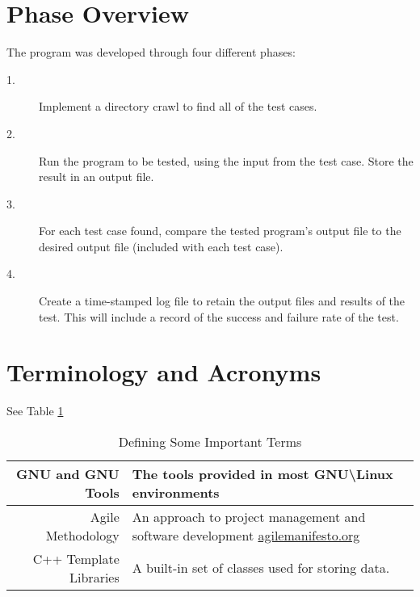 \section{Phase  Overview}
The program was developed through four different phases:
\begin{description}
\item[1. ] Implement a directory crawl to find all of the test cases.
\item[2. ] Run the program to be tested, using the input from the test case. Store the result in an output file.
\item[3. ] For each test case found, compare the tested program's output file to the desired output file (included with each test case).
\item[4. ] Create a time-stamped log file to retain the output files and results of the test.  This will include a record of the success and failure rate of the test.
\end{description}


\section{Terminology and Acronyms}
See Table \ref{terms}
\begin{table}[tbh]
\begin{center}
\begin{tabular}{|r|l|}
\hline
    GNU and GNU Tools & The tools provided in most GNU\textbackslash Linux environments \\ \hline
    Agile Methodology & An approach to project management and software development \url{agilemanifesto.org} \\ \hline
    C++ Template Libraries & A built-in set of classes used for storing data. \\
    \hline
\end{tabular}
\caption{Defining Some Important Terms \label{terms}}
\end{center}
\end{table}
